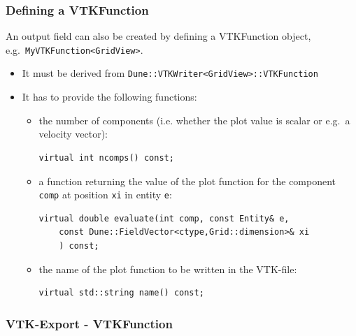 \documentclass[aspectratio=169,11pt]{beamer}
\theoremstyle{definition}
\begin{document}

\begin{frame}[fragile]
\frametitle{Defining a VTKFunction}
An output field can also be created by defining a VTKFunction object,
e.g.\ \lstinline!MyVTKFunction<GridView>!.
\begin{itemize}
\item It must be derived from
\lstinline!Dune::VTKWriter<GridView>::VTKFunction!
\item It has to provide the following functions:
\begin{itemize}
  \lstset{numbers=none}
\item the number of components (i.e. whether the plot value is scalar or
  e.g.\ a velocity vector):
  \begin{lstlisting}[numbers=none,basicstyle=\scriptsize\ttfamily]
virtual int ncomps() const;
  \end{lstlisting}
\item a function returning the value of the plot function for the component
  \lstinline!comp! at position \lstinline!xi! in entity \lstinline!e!:
  \begin{lstlisting}[numbers=none,basicstyle=\scriptsize\ttfamily]
virtual double evaluate(int comp, const Entity& e,
    const Dune::FieldVector<ctype,Grid::dimension>& xi
    ) const;
  \end{lstlisting}
\item the name of the plot function to be written in the VTK-file:
  \begin{lstlisting}[numbers=none,basicstyle=\scriptsize\ttfamily]
virtual std::string name() const;
  \end{lstlisting}
\end{itemize}
\end{itemize}
\end{frame}


\begin{frame}[allowframebreaks=1.0]
\frametitle{VTK-Export - VTKFunction}
\end{frame}
\end{document}
